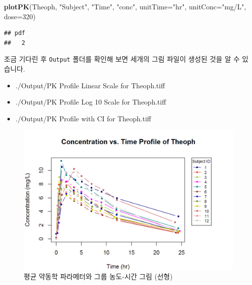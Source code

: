 \documentclass[12pt,]{krantz}
\newenvironment{Shaded}{\begin{snugshade}}{\end{snugshade}}
\newcommand{\DataTypeTok}[1]{\textcolor[rgb]{0.13,0.29,0.53}{#1}}
\newcommand{\DecValTok}[1]{\textcolor[rgb]{0.00,0.00,0.81}{#1}}
\newcommand{\KeywordTok}[1]{\textcolor[rgb]{0.13,0.29,0.53}{\textbf{#1}}}
\newcommand{\NormalTok}[1]{#1}
\newcommand{\StringTok}[1]{\textcolor[rgb]{0.31,0.60,0.02}{#1}}
\providecommand{\tightlist}{%
  \setlength{\itemsep}{0pt}\setlength{\parskip}{0pt}}
\begin{document}
\begin{Shaded}
\begin{Highlighting}[]
\KeywordTok{plotPK}\NormalTok{(Theoph, }\StringTok{"Subject"}\NormalTok{, }\StringTok{"Time"}\NormalTok{, }\StringTok{"conc"}\NormalTok{, }\DataTypeTok{unitTime=}\StringTok{"hr"}\NormalTok{, }\DataTypeTok{unitConc=}\StringTok{"mg/L"}\NormalTok{, }\DataTypeTok{dose=}\DecValTok{320}\NormalTok{)}
\end{Highlighting}
\end{Shaded}

\begin{verbatim}
## pdf 
##   2
\end{verbatim}

조금 기다린 후 \texttt{Output} 폴더를 확인해 보면 세개의 그림 파일이 생성된 것을 알 수 있습니다.

\begin{itemize}
\tightlist
\item
  ./Output/PK Profile Linear Scale for Theoph.tiff
\item
  ./Output/PK Profile Log 10 Scale for Theoph.tiff
\item
  ./Output/PK Profile with CI for Theoph.tiff
\end{itemize}

\begin{figure}
\includegraphics[width=1\linewidth]{Output/PK_Profile_Linear_Scale_for_Theoph} \caption{평균 약동학 파라메터와 그룹 농도-시간 그림 (선형)}\label{fig:unnamed-chunk-6}
\end{figure}
\end{document}
